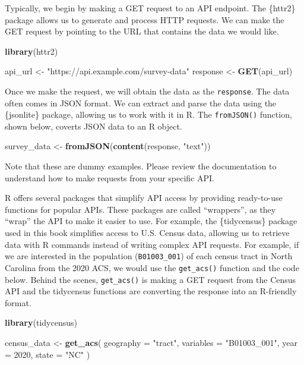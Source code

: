 \documentclass[
]{krantz}
\makeatletter
\newenvironment{Shaded}{\begin{snugshade}}{\end{snugshade}}
\newcommand{\AttributeTok}[1]{\textcolor[rgb]{0.27,0.27,0.27}{#1}}
\newcommand{\DecValTok}[1]{\textcolor[rgb]{0.06,0.06,0.06}{#1}}
\newcommand{\FunctionTok}[1]{\textcolor[rgb]{0.27,0.27,0.27}{\textbf{#1}}}
\newcommand{\NormalTok}[1]{#1}
\newcommand{\OtherTok}[1]{\textcolor[rgb]{0.37,0.37,0.37}{#1}}
\newcommand{\StringTok}[1]{\textcolor[rgb]{0.5,0.5,0.5}{#1}}
\newenvironment{kframe}{%
\medskip{}
\setlength{\fboxsep}{.8em}
 \def\at@end@of@kframe{}%
 \ifinner\ifhmode%
  \def\at@end@of@kframe{\end{minipage}}%
  \begin{minipage}{\columnwidth}%
 \fi\fi%
 \def\FrameCommand##1{\hskip\@totalleftmargin \hskip-\fboxsep
 \colorbox{shadecolor}{##1}\hskip-\fboxsep
     \hskip-\linewidth \hskip-\@totalleftmargin \hskip\columnwidth}%
 \MakeFramed {\advance\hsize-\width
   \@totalleftmargin\z@ \linewidth\hsize
   \@setminipage}}%
 {\par\unskip\endMakeFramed%
 \at@end@of@kframe}
\renewenvironment{Shaded}{\begin{kframe}}{\end{kframe}}
\makeatother
\begin{document}
Typically, we begin by making a GET request to an API endpoint. The \{httr2\} package allows us to generate and process HTTP requests. We can make the GET request by pointing to the URL that contains the data we would like.

\begin{Shaded}
\begin{Highlighting}[]
\FunctionTok{library}\NormalTok{(httr2)}

\NormalTok{api\_url }\OtherTok{\textless{}{-}} \StringTok{"https://api.example.com/survey{-}data"}
\NormalTok{response }\OtherTok{\textless{}{-}} \FunctionTok{GET}\NormalTok{(api\_url)}
\end{Highlighting}
\end{Shaded}

Once we make the request, we will obtain the data as the \texttt{response}. The data often comes in JSON format. We can extract and parse the data using the \{jsonlite\} package, allowing us to work with it in R. The \texttt{fromJSON()} function, shown below, coverts JSON data to an R object.

\begin{Shaded}
\begin{Highlighting}[]
\NormalTok{survey\_data }\OtherTok{\textless{}{-}} \FunctionTok{fromJSON}\NormalTok{(}\FunctionTok{content}\NormalTok{(response, }\StringTok{"text"}\NormalTok{))}
\end{Highlighting}
\end{Shaded}

Note that these are dummy examples. Please review the documentation to understand how to make requests from your specific API.

R offers several packages that simplify API access by providing ready-to-use functions for popular APIs. These packages are called ``wrappers'', as they ``wrap'' the API to make it easier to use. For example, the \{tidycensus\} package used in this book simplifies access to U.S. Census data, allowing us to retrieve data with R commands instead of writing complex API requests. For example, if we are interested in the population (\texttt{B01003\_001}) of each census tract in North Carolina from the 2020 ACS, we would use the \texttt{get\_acs()} function and the code below. Behind the scenes, \texttt{get\_acs()} is making a GET request from the Census API and the tidycensus functions are converting the response into an R-friendly format.

\begin{Shaded}
\begin{Highlighting}[]
\FunctionTok{library}\NormalTok{(tidycensus)}

\NormalTok{census\_data }\OtherTok{\textless{}{-}}
  \FunctionTok{get\_acs}\NormalTok{(}
    \AttributeTok{geography =} \StringTok{"tract"}\NormalTok{,}
    \AttributeTok{variables =} \StringTok{"B01003\_001"}\NormalTok{,}
    \AttributeTok{year =} \DecValTok{2020}\NormalTok{,}
    \AttributeTok{state =} \StringTok{"NC"}
\NormalTok{  )}
\end{Highlighting}
\end{Shaded}
\end{document}

